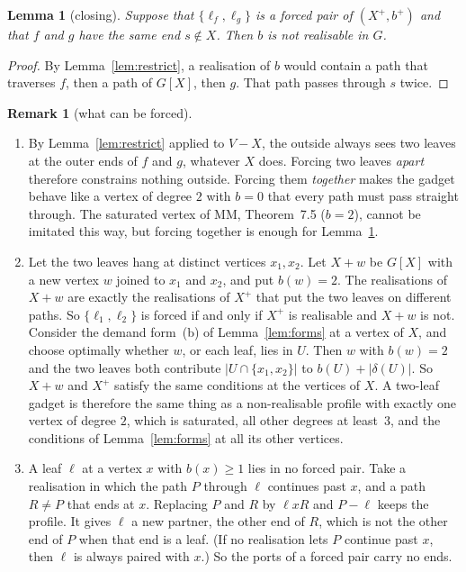 \documentclass[11pt]{amsart}
\newtheorem{lemma}[theorem]{Lemma}
\theoremstyle{definition}
\newtheorem{remark}[theorem]{Remark}
\begin{document}
\begin{lemma}[closing]\label{lem:closing}
Suppose that $\{\ell_f,\ell_g\}$ is a forced pair of $(X^+,b^+)$ and that $f$ and $g$ have the same end
$s\notin X$. Then $b$ is not realisable in $G$.
\end{lemma}

\begin{proof}
By Lemma~\ref{lem:restrict}, a realisation of $b$ would contain a path that traverses $f$, then a path
of $G[X]$, then $g$. That path passes through $s$ twice.
\end{proof}

\begin{remark}[what can be forced]\label{rem:forced}
\begin{enumerate}
\item By Lemma~\ref{lem:restrict} applied to $V-X$, the outside always sees two leaves at the outer
ends of $f$ and $g$, whatever $X$ does. Forcing two leaves \emph{apart} therefore constrains nothing
outside. Forcing them \emph{together} makes the gadget behave like a vertex of degree $2$ with $b=0$
that every path must pass straight through. The saturated vertex of MM, Theorem~7.5 ($b=2$),
cannot be imitated this way, but forcing together is enough for Lemma~\ref{lem:closing}.
\item Let the two leaves hang at distinct vertices $x_1,x_2$. Let $X+w$ be $G[X]$ with a new vertex $w$
joined to $x_1$ and $x_2$, and put $b(w)=2$. The realisations of $X+w$ are exactly the realisations of
$X^+$ that put the two leaves on different paths. So $\{\ell_1,\ell_2\}$ is forced if and only if $X^+$
is realisable and $X+w$ is not. Consider the demand form~(b) of Lemma~\ref{lem:forms} at a vertex of $X$, and choose
optimally whether $w$, or each leaf, lies in $U$. Then $w$ with $b(w)=2$ and the two leaves both
contribute $|U\cap\{x_1,x_2\}|$ to $b(U)+|\delta(U)|$. So $X+w$ and $X^+$ satisfy the same conditions
at the vertices of $X$. A two-leaf gadget is therefore the same thing as a non-realisable profile with
exactly one vertex of degree $2$, which is saturated, all other degrees at least~$3$, and the
conditions of Lemma~\ref{lem:forms} at all its other vertices.
\item A leaf $\ell$ at a vertex $x$ with $b(x)\ge1$ lies in no forced pair. Take a realisation in which
the path $P$ through $\ell$ continues past $x$, and a path $R\ne P$ that ends at $x$. Replacing $P$ and
$R$ by $\ell xR$ and $P-\ell$ keeps the profile. It gives $\ell$ a new partner, the other end of
$R$, which is not the other end of $P$ when that end is a leaf. (If no realisation lets $P$ continue
past $x$, then $\ell$ is always paired with $x$.) So the ports of a forced pair carry no ends.
\end{enumerate}
\end{remark}
\end{document}
